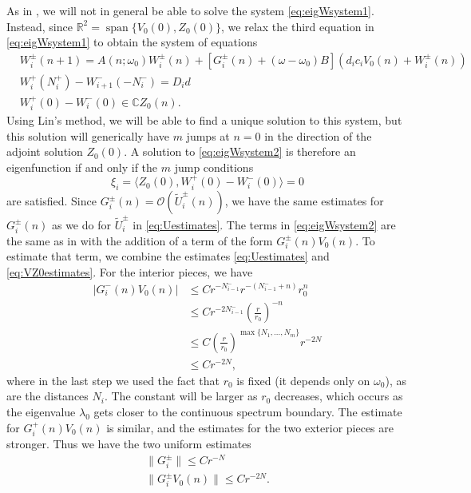 \documentclass[12pt,reqno]{amsart}
\def\R{{\mathbb R}}
\def\C{{\mathbb C}}
\DeclareMathOperator{\spn}{span}
\begin{document}
As in \cites{Parker2020,Sandstede1998}, we will not in general be able to solve the system \cref{eq:eigWsystem1}. Instead, since $\R^2 = \spn\{ V_0(0), Z_0(0) \}$, we relax the third equation in \cref{eq:eigWsystem1} to obtain the system of equations
\begin{equation}\label{eq:eigWsystem2}
	\begin{aligned}
	& W_i^\pm(n+1)
	= A(n; \omega_0) W_i^\pm(n) + [G_i^\pm(n) + (\omega - \omega_0) B](d_i c_i V_0(n) + W_i^\pm(n))\\
	& W_i^+(N_i^+) - W_{i+1}^-(-N_i^-) = D_i d \\
	&W_i^+(0) - W_i^-(0) \in \C Z_0(n).
	\end{aligned}
\end{equation}
Using Lin's method, we will be able to find a unique solution to this system, but this solution will generically have $m$ jumps at $n = 0$ in the direction of the adjoint solution $Z_0(0)$. A solution to \cref{eq:eigWsystem2} is therefore an eigenfunction if and only if the $m$ jump conditions
\begin{equation}
	\xi_i = \langle Z_0(0), W_i^+(0) - W_i^-(0) \rangle = 0
\end{equation}
are satisfied. Since $G_i^\pm(n) = \mathcal{O}(\tilde{U}_i^\pm(n))$, we have the same estimates for $G_i^\pm(n)$ as we do for $\tilde{U}_i^\pm$ in \cref{eq:Uestimates}. The terms in \cref{eq:eigWsystem2} are the same as in \cite{Parker2020} with the addition of a term of the form $G_i^\pm(n) V_0(n)$. To estimate that term, we combine the estimates \cref{eq:Uestimates} and \cref{eq:VZ0estimates}. For the interior pieces, we have
\begin{align*}
| G_i^-(n) V_0(n) | &\leq C r^{-N_{i-1}^-} r^{-(N_{i-1}^- + n)} r_0^n \\
&\leq C r^{-2 N_{i-1}^-} \left(\frac{r}{r_0}\right)^{-n} \\
&\leq C \left(\frac{r}{r_0}\right)^{\max\{N_1, \dots, N_m\}} r^{-2 N} \\
&\leq C r^{-2 N} ,
\end{align*}
where in the last step we used the fact that $r_0$ is fixed (it depends only on $\omega_0$), as are the distances $N_i$. The constant will be larger as $r_0$ decreases, which occurs as the eigenvalue $\lambda_0$ gets closer to the continuous spectrum boundary. The estimate for $G_i^+(n) V_0(n)$ is similar, and the estimates for the two exterior pieces are stronger. Thus we have the two uniform estimates
\begin{equation}\label{eq:unifest}
	\begin{aligned}
		\|G_i^\pm\| \leq C r^{-N} \\
		\|G_i^\pm V_0(n) \| \leq C r^{-2 N}.
	\end{aligned}
\end{equation}
\end{document}
